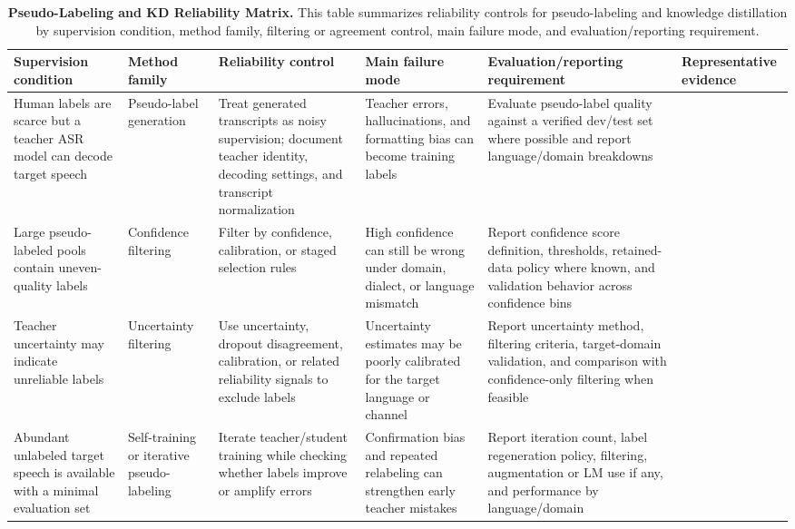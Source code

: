 \documentclass[pdflatex,sn-basic]{sn-jnl}
\theoremstyle{thmstyleone}
\theoremstyle{thmstyletwo}
\theoremstyle{thmstylethree}
\begin{document}
\begin{table}[htbp]
\setcounter{table}{3}
\footnotesize
\centering
\caption{\textbf{Pseudo-Labeling and KD Reliability Matrix.} This table summarizes reliability controls for pseudo-labeling and knowledge distillation by supervision condition, method family, filtering or agreement control, main failure mode, and evaluation/reporting requirement.}
\label{tab:4}
\begin{tabularx}{\textwidth}{YYYYYY}
\toprule
\textbf{Supervision condition} & \textbf{Method family} & \textbf{Reliability control} & \textbf{Main failure mode} & \textbf{Evaluation/reporting requirement} & \textbf{Representative evidence} \\
\midrule
Human labels are scarce but a teacher ASR model can decode target speech & Pseudo-label generation & Treat generated transcripts as noisy supervision; document teacher identity, decoding settings, and transcript normalization & Teacher errors, hallucinations, and formatting bias can become training labels & Evaluate pseudo-label quality against a verified dev/test set where possible and report language/domain breakdowns & \citep{kahn2019selftraining,park20d_interspeech,bhogale24_interspeech} \\
Large pseudo-labeled pools contain uneven-quality labels & Confidence filtering & Filter by confidence, calibration, or staged selection rules & High confidence can still be wrong under domain, dialect, or language mismatch & Report confidence score definition, thresholds, retained-data policy where known, and validation behavior across confidence bins & \citep{park20d_interspeech,khurana2020dust,bhogale24_interspeech} \\
Teacher uncertainty may indicate unreliable labels & Uncertainty filtering & Use uncertainty, dropout disagreement, calibration, or related reliability signals to exclude labels & Uncertainty estimates may be poorly calibrated for the target language or channel & Report uncertainty method, filtering criteria, target-domain validation, and comparison with confidence-only filtering when feasible & \citep{khurana2020dust} \\
Abundant unlabeled target speech is available with a minimal evaluation set & Self-training or iterative pseudo-labeling & Iterate teacher/student training while checking whether labels improve or amplify errors & Confirmation bias and repeated relabeling can strengthen early teacher mistakes & Report iteration count, label regeneration policy, filtering, augmentation or LM use if any, and performance by language/domain & \citep{kahn2019selftraining,likhomanenko2020slimipl,xu2020iterativepseudolabeling} \\

\end{tabularx}
\end{table}
\end{document}
